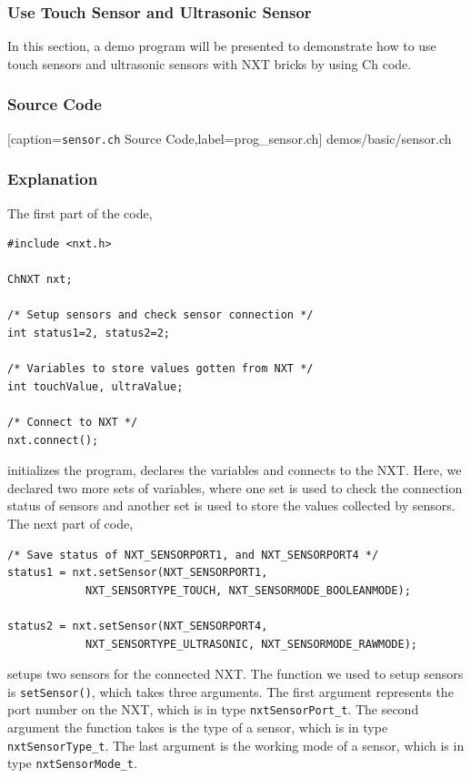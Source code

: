 \documentclass[11pt]{article}
\begin{document}
\subsubsection{Use Touch Sensor and Ultrasonic Sensor
\label{sec:sensor_touch_ultra}}
In this section, a demo program will be presented to demonstrate how to use
touch sensors and ultrasonic sensors with NXT bricks by using Ch code.

\subsubsection*{Source Code}

    [caption={{\tt sensor.ch} Source Code},label=prog_sensor.ch]
    {demos/basic/sensor.ch}

\subsubsection*{Explanation}
The first part of the code,
\begin{lstlisting}
#include <nxt.h>

ChNXT nxt;

/* Setup sensors and check sensor connection */
int status1=2, status2=2;

/* Variables to store values gotten from NXT */
int touchValue, ultraValue;

/* Connect to NXT */
nxt.connect();
\end{lstlisting}
initializes the program, declares the variables and connects to the NXT. Here, 
we declared two more sets of variables, where one set is used to check the 
connection status of sensors and another set is used to store the values collected 
by sensors. The next part of code,
\begin{lstlisting}
/* Save status of NXT_SENSORPORT1, and NXT_SENSORPORT4 */
status1 = nxt.setSensor(NXT_SENSORPORT1, 
            NXT_SENSORTYPE_TOUCH, NXT_SENSORMODE_BOOLEANMODE);

status2 = nxt.setSensor(NXT_SENSORPORT4,
            NXT_SENSORTYPE_ULTRASONIC, NXT_SENSORMODE_RAWMODE);
\end{lstlisting}
setups two sensors for the connected NXT. The function we used to setup sensors 
is {\tt setSensor()}, which takes three arguments. The first argument represents 
the port number on the NXT, which is in type {\tt nxtSensorPort\_t}. The second 
argument the function takes is the type of a sensor, which is in type {\tt nxtSensorType\_t}. 
The last argument is the working mode of a sensor, which is in type {\tt nxtSensorMode\_t}. 
\end{document}
